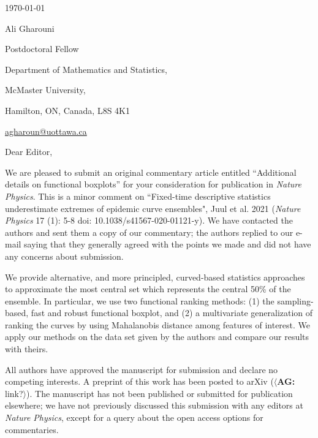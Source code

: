 \documentclass[12pt,letterpaper]{letter}
\newcommand{\ali}[1]{\textcolor{blush}{$\langle$\textbf{AG:} #1$\rangle$}}
\newcommand{\journalname}{\emph{Nature Physics}\xspace}
\begin{document}
\begin{multicols}{2}
\footnotesize
\begin{flushleft}

% 

\vfill

{\normalsize \mydate
\today}
\end{flushleft}

\columnbreak

\begin{flushright}
Ali Gharouni

Postdoctoral Fellow 

Department of Mathematics and Statistics,

McMaster University,

Hamilton, ON, Canada, L8S 4K1

\href{mailto:agharoun@uottawa.ca}{agharoun@uottawa.ca}
\end{flushright}

\end{multicols}

\setlength{\parskip}{1em}
\thispagestyle{empty}

\vspace{-1em}

Dear Editor,

We are pleased to submit an original commentary article entitled ``Additional details on functional boxplots'' for your consideration for publication in \journalname{}. This is a minor comment on ``Fixed-time descriptive statistics underestimate extremes of epidemic curve ensembles", Juul et al. 2021 (\journalname{} 17 (1): 5-8 doi: 10.1038/s41567-020-01121-y). We have contacted the authors and sent them a copy of our commentary; the authors replied to our e-mail saying that they generally agreed with the points we made and did not have any concerns about submission.

We provide alternative, and more principled, curved-based statistics approaches to approximate the most central set which represents the central 50\% of the ensemble. In particular, we use two functional ranking methods: (1) the sampling-based, fast and robust functional boxplot, and (2) a multivariate generalization of ranking the curves by using Mahalanobis distance among features of interest. We apply our methods on the data set given by the authors and compare our results with theirs.

All authors have approved the manuscript for submission and declare no competing interests. A preprint of this work has been posted to arXiv (\ali{link?}). The manuscript has not been published or submitted for publication elsewhere; we have not previously discussed this submission with any editors at \journalname{}, except for a query about the open access options for commentaries.
\end{document}
